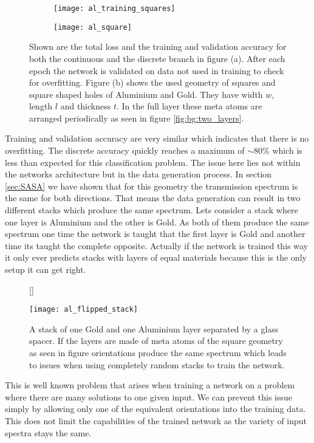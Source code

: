 \begin{figure}[H]
\centering
\captionsetup[subfigure]{position=b}
\begin{subfigure}{.6\textwidth}
    \centering
    \texttt{[image: al\_training\_squares]}
    \caption{}
    \label{}
\end{subfigure}%
\begin{subfigure}{.4\textwidth}
    \centering
    \texttt{[image: al\_square]}
    \caption{}
    \label{fig:al:square}
\end{subfigure}
\caption{Shown are the total loss and the training and validation accuracy for both the continuous and the discrete branch in figure (a). After each epoch the network is validated on data not used in training to check for overfitting. Figure (b) shows the used geometry of squares and square shaped holes of Aluminium and Gold. They have width $w$, length $l$ and thickness $t$. In the full layer these meta atoms are arranged periodically as seen in figure \ref{fig:bg:two_layers}.}
\label{}
\end{figure}


Training and validation accuracy are very similar which indicates that there is no overfitting. The discrete accuracy quickly reaches a maximum of $\sim 80\%$
which is less than expected for this classification problem. The issue here lies not within the networks architecture but in the data generation process. In section \ref{sec:SASA} we have shown that for this geometry the transmission spectrum is the same for both directions. That means the data generation can result in two different stacks which produce the same spectrum. Lets consider a stack where one layer is Aluminium and the other is Gold. As both of them produce the same spectrum one time the network is taught that the first layer is Gold and another time its taught the complete opposite. Actually if the network is trained this way it only ever predicts stacks with layers of equal materials because this is the only setup it can get right.
\\

\begin{figure}[H]
    [\FBwidth]
    {\caption{A stack of one Gold and one Aluminium layer separated by a glass spacer. If the layers are made of meta atoms of the square geometry as seen in figure orientations produce the same spectrum which leads to issues when using completely random stacks to train the network.}
    \label{fig:test}}
    {\texttt{[image: al\_flipped\_stack]}}
\end{figure}


\newpage
This is well known problem that arises when training a network on a problem where there are many solutions to one given input.
We can prevent this issue simply by allowing only one of the equivalent orientations into the training data. This does not limit the capabilities of the trained network as the variety of input spectra stays the same.
